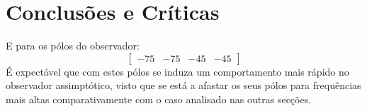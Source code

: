 \documentclass[%
  reprint,
  nofootinbib,
  amsmath,amssymb,
  aps,
  10pt,
  a4paper
]{revtex4-1}
\begin{document}
\section{Conclusões e Críticas}
E para os pólos do observador:
\begin{equation}
\begin{bmatrix}
-75 & -75  & -45 &-45
\end{bmatrix}
\end{equation}
É expectável que com estes pólos se induza um comportamento mais rápido no observador assimptótico, visto que se está a afastar os seus pólos para frequências mais altas comparativamente com o caso analisado nas outras secções.









\label{s:conclu}



\nocite{*}
{}
\end{document}
